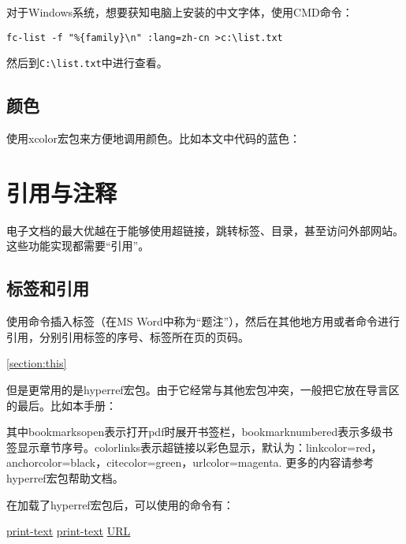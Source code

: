 {对于Windows系统，想要获知电脑上安装的中文字体，使用CMD命令：
\begin{verbatim}
fc-list -f "%{family}\n" :lang=zh-cn >c:\list.txt
\end{verbatim}

然后到\verb|C:\list.txt|中进行查看。

\subsection{颜色}
使用xcolor宏包来方便地调用颜色。比如本文中代码的蓝色：
\begin{latex}{}
\usepackage{xcolor}
{}
\end{latex}

\section{引用与注释}
电子文档的最大优越在于能够使用超链接，跳转标签、目录，甚至访问外部网站。这些功能实现都需要“引用”。
\subsection{标签和引用}
使用\latexline{\\label}命令插入标签（在MS Word中称为“题注”），然后在其他地方用\latexline{\\ref}或者\latexline{\\pageref}命令进行引用，分别引用标签的序号、标签所在页的页码。
\begin{latex}{}
\label{section:this}
\ref{section:this}
\pageref{section:this}
\end{latex}

但是更常用的是hyperref宏包。由于它经常与其他宏包冲突，一般把它放在导言区的最后。比如本手册：
\begin{latex}{}
\usepackage[colorlinks,bookmarksopen=true,
bookmarksnumbered=true]{hyperref}
\end{latex}

其中bookmarksopen表示打开pdf时展开书签栏，bookmarknumbered表示多级书签显示章节序号。colorlinks表示超链接以彩色显示，默认为：linkcolor=red，anchorcolor=black，citecolor=green，urlcolor=magenta. 更多的内容请参考hyperref宏包帮助文档。

在加载了hyperref宏包后，可以使用的命令有：
\begin{latex}{}
\hyperref[label-name]{print-text}
\href{URL}{print-text}
\url{URL}
\end{latex}

}
